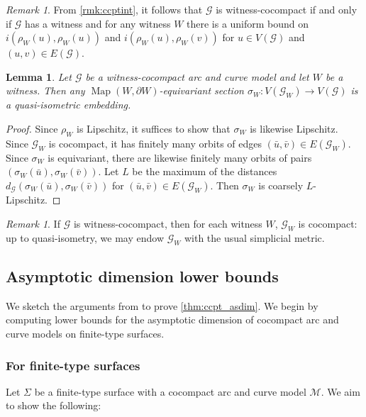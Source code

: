 \documentclass[twoside]{amsart}
\theoremstyle{plain}
\newtheorem{lemma}[theorem]{Lemma}
\theoremstyle{break}
\theoremstyle{definition}
\theoremstyle{remark}
\newtheorem*{remark}{Remark}
\newtheorem{remark*}[theorem]{Remark}
\DeclareMathOperator{\Map}{Map}
\newcommand{\G}{\mathcal G}
\newcommand{\M}{\mathcal M}
\begin{document}
\begin{remark*}\label{rmk:wccptint}
  From \cref{rmk:ccptint}, it follows that $\G$ is
  witness-cocompact if and only if $\G$ has a witness and for any
  witness $W$ there is a uniform bound on $i(\rho_W(u),\rho_W(u))$
  and $i(\rho_W(u),\rho_W(v))$ for $u \in V(\G)$ and $(u,v) \in
  E(\G)$.
\end{remark*}

\begin{lemma}\label{lem:eqisec}
  Let $\G$ be a witness-cocompact arc and curve model and let $W$ be a
  witness.  Then any $\Map(W,\partial W)$-equivariant section
  $\sigma_W : V(\G_W) \to V(\G)$ is a quasi-isometric embedding.
  \end{lemma}

\begin{proof}
  Since $\rho_W$ is Lipschitz, it suffices to show that $\sigma_W$
  is likewise Lipschitz.
  Since $\G_W$ is
  cocompact, it has finitely many orbits of edges $(\bar u,\bar v)
  \in E(\G_W)$. Since $\sigma_W$ is equivariant, there are likewise
  finitely many orbits of pairs $(\sigma_W(\bar u), \sigma_W(\bar
  v))$. Let $L$ be the maximum of the distances
  $d_\G(\sigma_W(\bar u),\sigma_W(\bar v))$ for $(\bar u,\bar v) \in
  E(\G_W)$. Then $\sigma_W$ is coarsely $L$-Lipschitz.
\end{proof}

\begin{remark}
  If $\G$ is witness-cocompact, then for each witness $W$, $\G_W$ is
  cocompact: up to quasi-isometry, we may endow
  $\G_W$ with the usual simplicial metric.
\end{remark}

\subsection{Asymptotic dimension lower bounds}\label{sec:asdim_ccpt}

We sketch the arguments from \cite{ga_asdim} to prove
\cref{thm:ccpt_asdim}.  We begin by computing lower bounds
for the asymptotic dimension of cocompact arc and curve models on
finite-type surfaces.

\subsubsection{For finite-type surfaces}\label{sec:asdim_ft}

Let $\Sigma$ be a finite-type surface with a cocompact arc and curve
model $\M$.  We aim to show the following:
\end{document}
